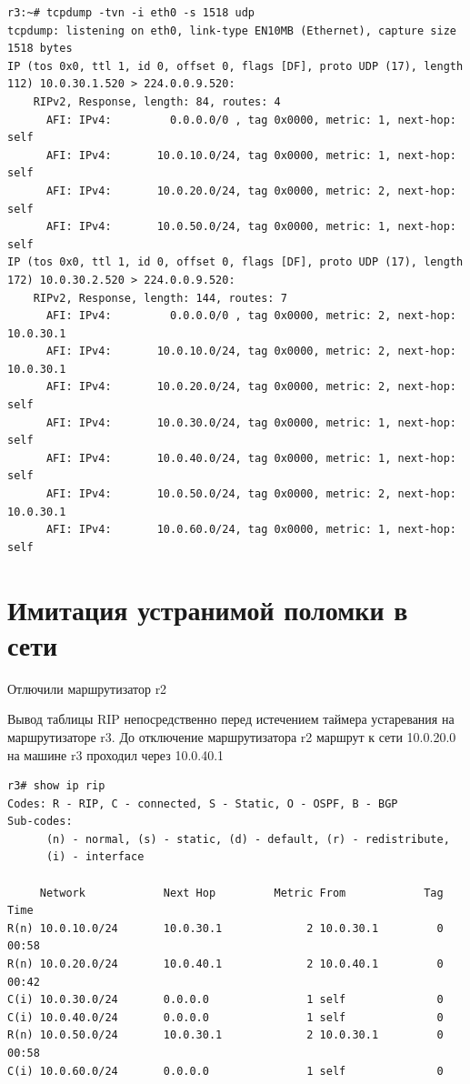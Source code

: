 \documentclass[a4paper,12pt]{article}
\begin{document}
\begin{Verbatim}
r3:~# tcpdump -tvn -i eth0 -s 1518 udp
tcpdump: listening on eth0, link-type EN10MB (Ethernet), capture size 1518 bytes
IP (tos 0x0, ttl 1, id 0, offset 0, flags [DF], proto UDP (17), length 112) 10.0.30.1.520 > 224.0.0.9.520: 
	RIPv2, Response, length: 84, routes: 4
	  AFI: IPv4:         0.0.0.0/0 , tag 0x0000, metric: 1, next-hop: self
	  AFI: IPv4:       10.0.10.0/24, tag 0x0000, metric: 1, next-hop: self
	  AFI: IPv4:       10.0.20.0/24, tag 0x0000, metric: 2, next-hop: self
	  AFI: IPv4:       10.0.50.0/24, tag 0x0000, metric: 1, next-hop: self
IP (tos 0x0, ttl 1, id 0, offset 0, flags [DF], proto UDP (17), length 172) 10.0.30.2.520 > 224.0.0.9.520: 
	RIPv2, Response, length: 144, routes: 7
	  AFI: IPv4:         0.0.0.0/0 , tag 0x0000, metric: 2, next-hop: 10.0.30.1
	  AFI: IPv4:       10.0.10.0/24, tag 0x0000, metric: 2, next-hop: 10.0.30.1
	  AFI: IPv4:       10.0.20.0/24, tag 0x0000, metric: 2, next-hop: self
	  AFI: IPv4:       10.0.30.0/24, tag 0x0000, metric: 1, next-hop: self
	  AFI: IPv4:       10.0.40.0/24, tag 0x0000, metric: 1, next-hop: self
	  AFI: IPv4:       10.0.50.0/24, tag 0x0000, metric: 2, next-hop: 10.0.30.1
	  AFI: IPv4:       10.0.60.0/24, tag 0x0000, metric: 1, next-hop: self
\end{Verbatim}

\section{Имитация устранимой поломки в сети}



Отлючили маршрутизатор r2

Вывод таблицы RIP непосредственно перед истечением таймера устаревания на маршрутизаторе r3.
До отключение маршрутизатора r2 маршрут к сети 10.0.20.0 на машине r3 проходил через  10.0.40.1

\begin{Verbatim}
r3# show ip rip
Codes: R - RIP, C - connected, S - Static, O - OSPF, B - BGP
Sub-codes:
      (n) - normal, (s) - static, (d) - default, (r) - redistribute,
      (i) - interface

     Network            Next Hop         Metric From            Tag Time
R(n) 10.0.10.0/24       10.0.30.1             2 10.0.30.1         0 00:58
R(n) 10.0.20.0/24       10.0.40.1             2 10.0.40.1         0 00:42
C(i) 10.0.30.0/24       0.0.0.0               1 self              0
C(i) 10.0.40.0/24       0.0.0.0               1 self              0
R(n) 10.0.50.0/24       10.0.30.1             2 10.0.30.1         0 00:58
C(i) 10.0.60.0/24       0.0.0.0               1 self              0

\end{Verbatim}
\end{document}

